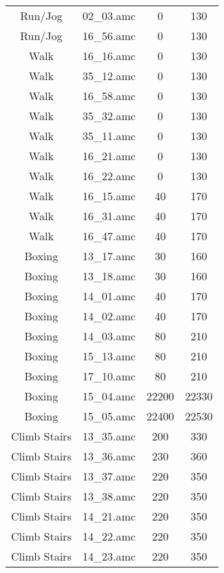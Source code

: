 \begin{longtable}{cccc}
    Run/Jog & 02\_03.amc & 0 & 130 \\
    Run/Jog & 16\_56.amc & 0 & 130 \\
    Walk & 16\_16.amc & 0 & 130 \\
    Walk & 35\_12.amc & 0 & 130 \\
    Walk & 16\_58.amc & 0 & 130 \\
    Walk & 35\_32.amc & 0 & 130 \\
    Walk & 35\_11.amc & 0 & 130 \\
    Walk & 16\_21.amc & 0 & 130 \\
    Walk & 16\_22.amc & 0 & 130 \\
    Walk & 16\_15.amc & 40 & 170 \\
    Walk & 16\_31.amc & 40 & 170 \\
    Walk & 16\_47.amc & 40 & 170 \\
    Boxing & 13\_17.amc & 30 & 160 \\
    Boxing & 13\_18.amc & 30 & 160 \\
    Boxing & 14\_01.amc & 40 & 170 \\
    Boxing & 14\_02.amc & 40 & 170 \\
    Boxing & 14\_03.amc & 80 & 210 \\
    Boxing & 15\_13.amc & 80 & 210 \\
    Boxing & 17\_10.amc & 80 & 210 \\
    Boxing & 15\_04.amc & 22200 & 22330 \\
    Boxing & 15\_05.amc & 22400 & 22530 \\
    Climb Stairs & 13\_35.amc & 200 & 330 \\
    Climb Stairs & 13\_36.amc & 230 & 360 \\
    Climb Stairs & 13\_37.amc & 220 & 350 \\
    Climb Stairs & 13\_38.amc & 220 & 350 \\
    Climb Stairs & 14\_21.amc & 220 & 350 \\
    Climb Stairs & 14\_22.amc & 220 & 350 \\
    Climb Stairs & 14\_23.amc & 220 & 350 \\
\end{longtable}

